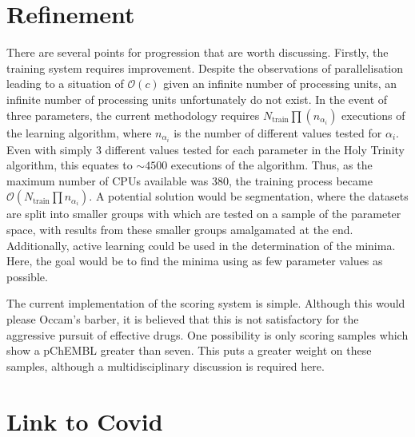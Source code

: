 \section{Refinement}
There are several points for progression that are worth discussing. Firstly, the training system requires improvement. Despite the observations of parallelisation leading to a situation of $\mathcal{O}(c)$ given an infinite number of processing units, an infinite number of processing units unfortunately do not exist. In the event of three parameters, the current methodology requires $N_\mathrm{train}\prod(n_{\alpha_i})$ executions of the learning algorithm, where $n_{\alpha_i}$ is the number of different values tested for $\alpha_i$. Even with simply 3 different values tested for each parameter in the Holy Trinity algorithm, this equates to $\sim{}4500$ executions of the algorithm. Thus, as the maximum number of CPUs available was 380, the training process became $\mathcal{O}\left(N_\mathrm{train}\prod{n_{\alpha_i}}\right)$. A potential solution would be segmentation, where the datasets are split into smaller groups with which are tested on a sample of the parameter space, with results from these smaller groups amalgamated at the end. Additionally, active learning could be used in the determination of the minima. Here, the goal would be to find the minima using as few parameter values as possible.

The current implementation of the scoring system is simple. Although this would please Occam's barber, it is believed that this is not satisfactory for the aggressive pursuit of effective drugs. One possibility is only scoring samples which show a pChEMBL greater than seven. This puts a greater weight on these samples, although a multidisciplinary discussion is required here.

\section{Link to Covid}
\blindtext[1]

